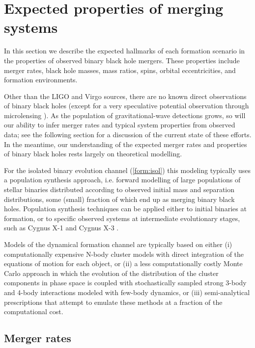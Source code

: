 \documentclass[iop,onecolumn]{revtex4}
\begin{document}
\section{Expected properties of merging systems}\label{merge}

In this section we describe the expected hallmarks of each formation scenario in the properties of observed binary black hole mergers. These properties include merger rates, black hole masses, mass ratios, spins, orbital eccentricities, and formation environments.

Other than the LIGO and Virgo sources, there are no known direct observations of binary black holes (except for a very speculative potential observation through microlensing \citep{Dong:2007}). As the population of gravitational-wave detections grows, so will our ability to infer merger rates and typical system properties from observed data; see the following section for a discussion of the current state of these efforts. In the meantime, our understanding of the expected merger rates and properties of binary black holes rests largely on theoretical modelling. 

For the isolated binary evolution channel (\autoref{form:isol}) this modeling typically uses a population synthesis approach, i.e. forward modelling of large populations of stellar binaries distributed according to observed initial mass and separation distributions, some (small) fraction of which end up as merging binary black holes. Population synthesis techniques can be applied either to initial binaries at formation, or to specific observed systems at intermediate evolutionary stages, such as Cygnus X-1 \citep{Bulik:2008} and Cygnus X-3 \citep{CygnusX3:2012}.  

Models of the dynamical formation channel are typically based on either (i) computationally expensive N-body cluster models with direct integration of the equations of motion for each object, or (ii) a less computationally costly Monte Carlo approach in which the evolution of the distribution of the cluster components in phase space is coupled with stochastically sampled strong 3-body and 4-body interactions modeled with few-body dynamics, or (iii) semi-analytical prescriptions that attempt to emulate these methods at a fraction of the computational cost. 

\subsection{Merger rates}
\end{document}
